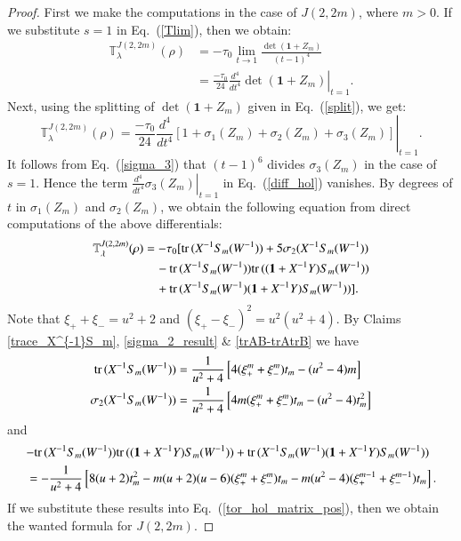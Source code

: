 \documentclass[a4paper]{amsart}
\theoremstyle{plain}
\theoremstyle{definition}
\theoremstyle{remark}
\newcommand{\I}{\mathbf{1}}
\newcommand{\trace}{{\rm tr}\,}
\begin{document}
\begin{proof}
First we make the computations in the case of $J(2, 2m)$, where $m > 0$. If we substitute $s = 1$ in Eq.~(\ref{Tlim}), then we obtain:
\begin{align}
{\mathbb T}^{J(2, 2m)}_{\lambda} (\rho)
&=
-\tau_0
\lim_{t \to 1}
\frac{\det(\I + Z_m)}{(t-1)^4} \nonumber \\
&=
\frac{-\tau_0}{24} \left.\frac{d^4}{dt^4}\det(\I+Z_m)\right|_{t=1}. \nonumber
\end{align}
Next, using the splitting of $\det(\I+Z_m)$ given in Eq.~(\ref{split}), we get:
\begin{equation}\label{diff_hol}
{\mathbb T}^{J(2, 2m)}_{\lambda} (\rho)
 = \frac{-\tau_0}{24} \left.\frac{d^4}{dt^4}\left[ 1^{} + \sigma_1(Z_m) + \sigma_2(Z_m) + \sigma_3(Z_m) \right]\right|_{t=1}. 
 \end{equation}
It follows from Eq.~(\ref{sigma_3}) that $(t-1)^6$ divides $\sigma_3(Z_m)$ in the case of $s = 1$.
Hence the term $\left.\frac{d^4}{dt^4} \sigma_3(Z_m)\right|_{t=1}$ in Eq.~(\ref{diff_hol}) vanishes.
By degrees of $t$ in $\sigma_1(Z_m)$ and $\sigma_2(Z_m)$, 
we obtain the following equation from direct computations of the above differentials:
\begin{align}
{\mathbb T}^{J(2, 2m)}_{\lambda} (\rho)
&=
-\tau_0[
\trace(X^{-1}S_m(W^{-1}))+5\sigma_2(X^{-1}S_m(W^{-1})) \label{tor_hol_matrix_pos}\\
& \quad
-\trace(X^{-1}S_m(W^{-1})) \trace((\I+X^{-1}Y)S_m(W^{-1})) \nonumber \\
&\quad
+\trace(X^{-1}S_m(W^{-1})(\I+X^{-1}Y)S_m(W^{-1})) ] \nonumber.
\end{align}
Note that $\xi_{+}  + \xi_{-} = u^2+2$ and $(\xi_{+} - \xi_{-})^2 = u^2(u^2+4)$.
By Claims \ref{trace_X^{-1}S_m}, \ref{sigma_2_result} \& \ref{trAB-trAtrB} 
we have
%
\begin{align*}
\trace(X^{-1}S_m(W^{-1})) 
&=
\frac{1}{u^2+4}
\left[
4(\xi_{+}^m + \xi_{-}^m)t_m - (u^2-4)m
\right] \\
\sigma_2(X^{-1}S_m(W^{-1})) 
&=
\frac{1}{u^2+4}
\left[
4m(\xi_{+}^m + \xi_{-}^m)t_m - (u^2 - 4)t^2_m
\right]
\end{align*}
and 
\begin{align*}
\lefteqn{
-\trace(X^{-1}S_m(W^{-1}))\trace((\I+X^{-1}Y)S_m(W^{-1}))
+ \trace(X^{-1}S_m(W^{-1})(\I+X^{-1}Y)S_m(W^{-1}))
}
& \\
&=
-\frac{1}{u^2+4}
\left[
8(u+2)t^2_m 
-m(u+2)(u-6)(\xi_{+}^m + \xi_{-}^m)t_m
-m(u^2-4)(\xi_{+}^{m-1}+\xi_{-}^{m-1})t_m
\right].
\end{align*}
If we substitute these results into Eq.~(\ref{tor_hol_matrix_pos}), then
we obtain the wanted formula for $J(2, 2m)$.
%



\end{proof}
\end{document}
